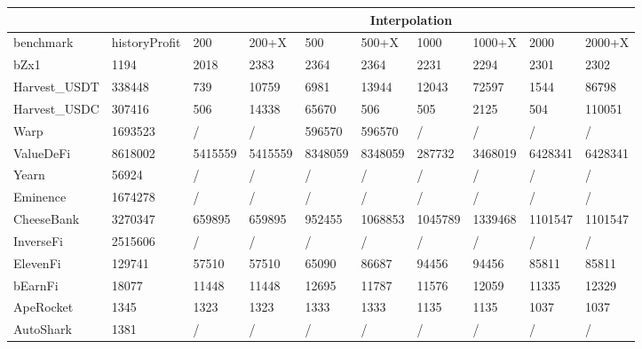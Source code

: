 \begin{table}[thbp]
\begin{tabular}{|l|l|llllllll|} 
    \hline
    \multicolumn{2}{|l|}{}                       & \multicolumn{8}{c|}{Interpolation}                                             \\ \hline
benchmark             & historyProfit            & 200     & 200+X   & 500     & 500+X   & 1000    & 1000+X  & 2000    & 2000+X  \\
bZx1                  & 1194                     & 2018    & 2383    & 2364    & 2364    & 2231    & 2294    & 2301    & 2302    \\
Harvest\_USDT         & 338448                   & 739     & 10759   & 6981    & 13944   & 12043   & 72597   & 1544    & 86798   \\
Harvest\_USDC         & 307416                   & 506     & 14338   & 65670   & 506     & 505     & 2125    & 504     & 110051  \\
Warp                  & 1693523                  & /       & /       & 596570  & 596570  & /       & /       & /       & /       \\
ValueDeFi             & 8618002                  & 5415559 & 5415559 & 8348059 & 8348059 & 287732  & 3468019 & 6428341 & 6428341 \\
Yearn                 & 56924                    & /       & /       & /       & /       & /       & /       & /       & /       \\
Eminence              & 1674278                  & /       & /       & /       & /       & /       & /       & /       & /       \\
CheeseBank            & 3270347                  & 659895  & 659895  & 952455  & 1068853 & 1045789 & 1339468 & 1101547 & 1101547 \\
InverseFi             & 2515606                  & /       & /       & /       & /       & /       & /       & /       & /       \\
ElevenFi              & 129741                   & 57510   & 57510   & 65090   & 86687   & 94456   & 94456   & 85811   & 85811   \\
bEarnFi               & 18077                    & 11448   & 11448   & 12695   & 11787   & 11576   & 12059   & 11335   & 12329   \\
ApeRocket             & 1345                     & 1323    & 1323    & 1333    & 1333    & 1135    & 1135    & 1037    & 1037    \\
AutoShark             & 1381                     & /       & /       & /       & /       & /       & /       & /       & /       \\

\end{tabular}
\end{table}
